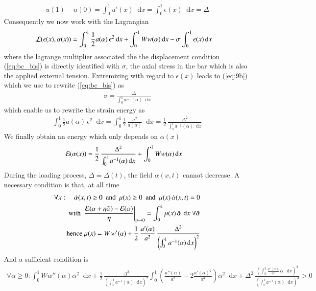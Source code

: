 \documentclass[final,3p,times,authoryear]{elsarticle}
\renewcommand*\d{\mathop{}\!\mathrm{d}} %
\begin{document}
\begin{align}
\label{eq:bc_bis}
u(1)-u(0) = \int_0^1 u'(x) \d x = \int_0^1 \epsilon(x) \d x =  \Delta
\end{align}
Consequently we now work with the Lagrangian
\begin{align}
{\cal L}(\epsilon(x),\alpha(x)) & = \int_0^1 \frac12 a(\alpha) \, \epsilon^2 \d x+ \int_0^1 W  w(\alpha) \d x - \sigma \int_0^1 \epsilon(x) \d x
\end{align}
where the lagrange multiplier associated the the displacement condition (\ref{eq:bc_bis}) is directly identified with $\sigma$, the axial stress in the bar which is also the applied external tension.
Extremizing with regard to $\epsilon(x)$ leads to (\ref{eq:9b}) which we use to rewrite (\ref{eq:bc_bis}) as
\begin{align}
\sigma = \frac{\Delta}{ \int_0^1 a^{-1}(\alpha)  \d x}
\end{align}
which enable us to rewrite the strain energy as
\begin{align}
 \int_0^1 \frac12 a(\alpha) \, \epsilon^2 \d x =  \int_0^1 \frac12 \, \frac{\sigma^2}{a(\alpha)}  \d x
 = \frac12 \, \frac{\Delta^2}{\int_0^1 a^{-1}(\alpha) \d x}
\end{align}
We finally obtain an energy which only depends on $\alpha(x)$
\begin{align}
{\cal E}(\alpha(x)) & = \frac12 \, \frac{\Delta^2}{\int_0^1 a^{-1}(\alpha) \d x}  +
 \int_0^1 W  w(\alpha) \d x
\end{align}
During the loading process, $\Delta = \Delta(t)$, the field $\alpha(x,t)$ cannot decrease.
A necessary condition is that, at all time
\begin{subequations}
\begin{align}
\forall x: \quad \dot{\alpha}(x,t) \ge 0 \text{~ and ~}
\mu(x) \ge 0 \text{~ and ~}
\mu(x) \, \dot{\alpha}(x,t) = 0 \\
\text{ with } \left. \frac{{\cal E}(\alpha+\eta \bar{\alpha})-{\cal E}(\alpha)}{\eta} \right|_{\eta \to 0}
=
\int_0^1 \mu(x) \, \bar{\alpha} \, \d x \text{ } \forall \bar{\alpha}
\\
\text{ hence } \mu(x)=
W \, w'(\alpha) + \frac12 \, \frac{a'(\alpha)}{a^2 } \, \frac{\Delta^2}{\left( \int_0^1 a^{-1}(\alpha) \d x \right)^2}
\end{align}
\end{subequations}
And a sufficient condition is
\begin{align}
\forall \bar{\alpha} \ge0: \int_0^1 W w''(\alpha) \bar{\alpha}^2 \d x +
 \frac12  \, \frac{\Delta^2}{\left( \int_0^1 a^{-1}(\alpha) \d x \right)^2}
\int_0^1
\left(
\frac{a''(\alpha)}{a^2 } -2\frac{a'(\alpha)^2}{a^3 }
\right)
\bar{\alpha}^2 \d x
+
\Delta^2 \, \frac{\left( \int_0^1 \frac{a'(\alpha)}{a^2} \, \bar{\alpha} \, \d x \right)^2 }{\left( \int_0^1 a^{-1}(\alpha) \d x \right)^3}
>0
\end{align}
\end{document}
